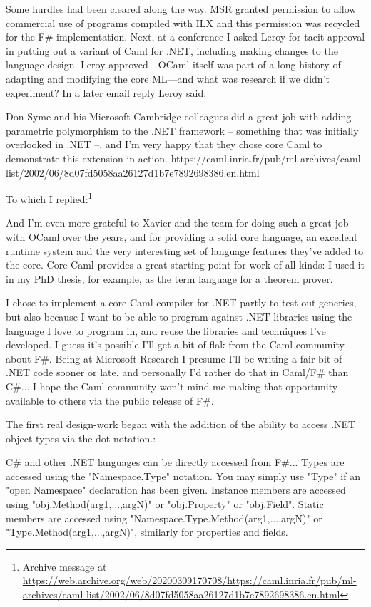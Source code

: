 \documentclass[acmsmall]{acmart}\settopmatter{}
\begin{document}
Some hurdles had been cleared along the way. MSR granted permission to allow commercial use of programs compiled with ILX and this
permission was recycled for the F\# implementation. Next, at a conference I asked Leroy for tacit approval in putting out a variant of
Caml for .NET, including making changes to the language design.  Leroy approved---OCaml itself was part of a long history of adapting
and modifying the core ML---and what was research if we didn’t experiment?  In a later email reply Leroy said:

\begin{verbquote}
Don Syme and his Microsoft Cambridge colleagues did a great job with adding parametric polymorphism to the .NET framework -- something that was initially overlooked in .NET --, and I'm very happy that they chose core Caml to demonstrate this extension in action. https://caml.inria.fr/pub/ml-archives/caml-list/2002/06/8d07fd5058aa26127d1b7e7892698386.en.html 
\end{verbquote}
To which I replied:\footnote{Archive message at \url{https://web.archive.org/web/20200309170708/https://caml.inria.fr/pub/ml-archives/caml-list/2002/06/8d07fd5058aa26127d1b7e7892698386.en.html}}
\begin{verbquote}
And I'm even more grateful to Xavier and the team for doing such a great job with OCaml over the years, and for providing a solid core language, an excellent runtime system and the very interesting set of language features they've added to the core.  Core Caml provides a great starting point for work of all kinds: I used it in my PhD thesis, for example, as the term language for a theorem prover.

I chose to implement a core Caml compiler for .NET partly to test out generics, but also because I want to be able to program against .NET libraries using the language I love to program in, and reuse the libraries and techniques I've developed.  I guess it's possible I'll get a bit of flak from the Caml community about F#.  Being at Microsoft Research I presume I'll be writing a fair bit of .NET code sooner or late, and personally I'd rather do that in Caml/F# than C#... I hope the Caml community won't mind me making that opportunity available to others via the public release of F#.  
\end{verbquote}
The first real design-work began with the addition of the ability to access .NET object types via the dot-notation.:
\begin{verbquote}
C# and other .NET languages can be directly accessed from F#...  Types are accessed using the "Namespace.Type" notation.  You may simply use "Type" if an "open Namespace" declaration has been given. Instance members are accessed using "obj.Method(arg1,...,argN)" or "obj.Property" or "obj.Field". Static members are accessed using "Namespace.Type.Method(arg1,...,argN)" or "Type.Method(arg1,...,argN)", similarly for properties and fields. 
\end{verbquote}
\end{document}

